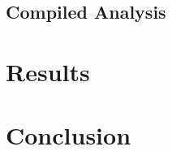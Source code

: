 \documentclass[tighten,linenumbers,twocolumn]{aastex631}
\def\um{\mathrm{\mu{} m}}
\begin{document}
\subsection{Compiled Analysis} 
\section{Results}

\section{Conclusion}


\end{document}

